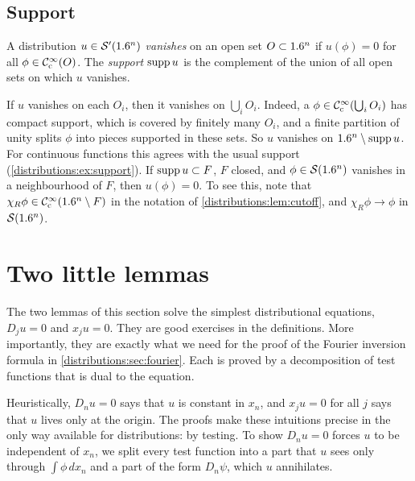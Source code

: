 \subsection{Support}
\begin{definition}\label{distributions:def:support}
A distribution $u\in\mathcal{S}'(1.6^n)$ \emph{vanishes} on an open set $O\subset1.6^n$ if
$u(\phi)=0$ for all $\phi\in\mathcal{C}^\infty_{\mathrm{c}}(O)$. The \emph{support} $\operatorname{supp} u$ is the complement of
the union of all open sets on which $u$ vanishes.
\end{definition}
If $u$ vanishes on each $O_i$, then it vanishes on $\bigcup_iO_i$. Indeed, a
$\phi\in\mathcal{C}^\infty_{\mathrm{c}}(\bigcup_iO_i)$ has compact support, which is covered by finitely many
$O_i$, and a finite partition of unity splits $\phi$ into pieces supported in these
sets. So $u$ vanishes on $1.6^n\setminus\operatorname{supp} u$. For continuous functions this agrees
with the usual support (\cref{distributions:ex:support}). If $\operatorname{supp} u\subset F$, $F$
closed, and $\phi\in\mathcal{S}(1.6^n)$ vanishes in a neighbourhood of $F$, then $u(\phi)=0$. To
see this, note that $\chi_R\phi\in\mathcal{C}^\infty_{\mathrm{c}}(1.6^n\setminus F)$ in the notation of
\cref{distributions:lem:cutoff}, and $\chi_R\phi\to\phi$ in $\mathcal{S}(1.6^n)$.

\section{Two little lemmas}\label{distributions:sec:little}

The two lemmas of this section solve the simplest distributional equations,
$D_ju=0$ and $x_ju=0$. They are good exercises in the definitions. More importantly,
they are exactly what we need for the proof of the Fourier inversion formula in
\cref{distributions:sec:fourier}. Each is proved by a decomposition of test functions
that is dual to the equation.

\begin{discussion}
Heuristically, $D_nu=0$ says that $u$ is constant in $x_n$, and $x_ju=0$ for all $j$
says that $u$ lives only at the origin. The proofs make these intuitions precise in
the only way available for distributions: by testing. To show $D_nu=0$ forces $u$ to be
independent of $x_n$, we split every test function into a part that $u$ sees only
through $\int\phi\,dx_n$ and a part of the form $D_n\psi$, which $u$ annihilates.
\end{discussion}

